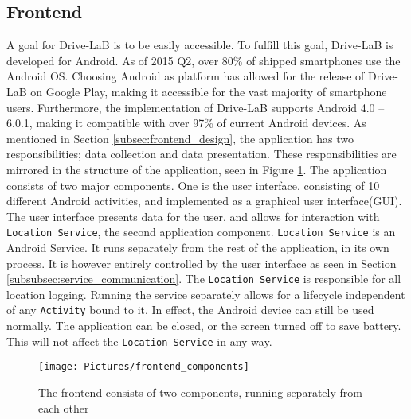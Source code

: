 \subsection{Frontend}\label{subsec:frontend_implementation}
A goal for Drive-LaB is to be easily accessible. To fulfill this goal, Drive-LaB is developed for Android. As of 2015 Q2, over 80\% of shipped smartphones use the Android OS\citep{smartphone_market_share}. Choosing Android as platform has allowed for the release of Drive-LaB on Google Play\citep{google_play_drivelab}, making it accessible for the vast majority of smartphone users. Furthermore, the implementation of Drive-LaB supports Android 4.0 – 6.0.1, making it compatible with over 97\% of current Android devices\citep{android_version_distribution}.
As mentioned in Section \ref{subsec:frontend_design}, the application has two responsibilities; data collection and data presentation. These responsibilities are mirrored in the structure of the application, seen in Figure \ref{fig:frontend_components}. The application consists of two major components. One is the user interface, consisting of 10 different Android activities\citep{android_activity}, and implemented as a graphical user interface(GUI). The user interface presents data for the user, and allows for interaction with \texttt{Location Service}, the second application component. \texttt{Location Service} is an Android Service\citep{android_service}. It runs separately from the rest of the application, in its own process. It is however entirely controlled by the user interface as seen in Section \ref{subsubsec:service_communication}. The \texttt{Location Service} is responsible for all location logging. Running the service separately allows for a lifecycle independent of any \texttt{Activity} bound to it. In effect, the Android device can still be used normally. The application can be closed, or the screen turned off to save battery. This will not affect the \texttt{Location Service} in any way.

\begin{figure}[tb]
\centering
\texttt{[image: Pictures/frontend\_components]}
\caption{The frontend consists of two components, running separately from each other}
\label{fig:frontend_components}
\end{figure}

